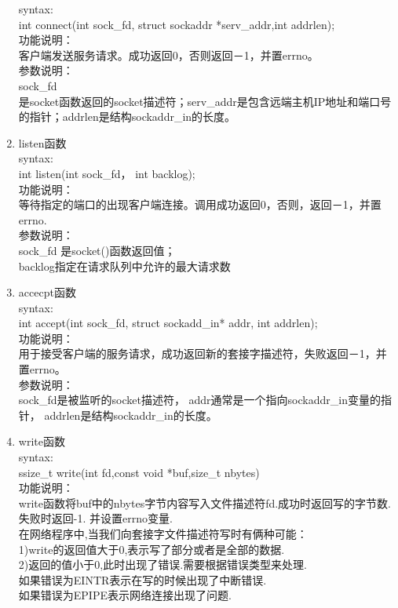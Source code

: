 \documentclass[utf8]{book}
\begin{document}
\begin{enumerate}
		syntax:  \\
		int connect(int sock\_fd, struct sockaddr *serv\_addr,int addrlen);\\
		功能说明：\\
		客户端发送服务请求。成功返回0，否则返回－1，并置errno。\\
		参数说明：\\
		sock\_fd\\ 是socket函数返回的socket描述符；serv\_addr是包含远端主机IP地址和端口号的指针；addrlen是结构sockaddr\_in的长度。\\
		
		\item listen函数\\
		syntax:\\
		int listen(int sock\_fd， int backlog);\\
		功能说明：\\
		等待指定的端口的出现客户端连接。调用成功返回0，否则，返回－1，并置errno.\\
		参数说明：\\
		sock\_fd 是socket()函数返回值；\\
		backlog指定在请求队列中允许的最大请求数	\\
		
		
		\item accecpt函数\\
		
		syntax:  \\
		int accept(int sock\_fd, struct sockadd\_in* addr, int addrlen);\\
		功能说明：\\
		用于接受客户端的服务请求，成功返回新的套接字描述符，失败返回－1，并置errno。\\
		参数说明：\\
		sock\_fd是被监听的socket描述符，
		addr通常是一个指向sockaddr\_in变量的指针，
		addrlen是结构sockaddr\_in的长度。\\
		
		
		\item write函数\\
		
		syntax:\\
		ssize\_t write(int fd,const void *buf,size\_t nbytes)\\
		功能说明：\\
		write函数将buf中的nbytes字节内容写入文件描述符fd.成功时返回写的字节数.失败时返回-1. 并设置errno变量.\\
		在网络程序中,当我们向套接字文件描述符写时有俩种可能：\\
		1)write的返回值大于0,表示写了部分或者是全部的数据.\\
		2)返回的值小于0,此时出现了错误.需要根据错误类型来处理.\\
		如果错误为EINTR表示在写的时候出现了中断错误.\\
		如果错误为EPIPE表示网络连接出现了问题.\\
		

\end{enumerate}
\end{document}
